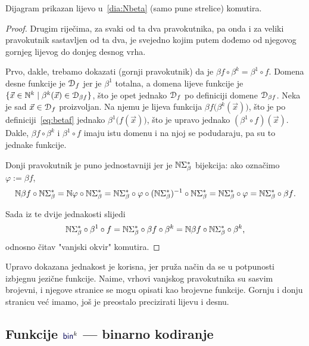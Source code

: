 \begin{lema}\label{lm:pravkomut}
Dijagram prikazan lijevo u~\eqref{dia:Nbeta} (samo pune strelice) komutira.
\end{lema}
\begin{proof}
Drugim riječima, za svaki od ta dva pravokutnika, pa onda i za veliki pravokutnik sastavljen od ta dva, je svejedno kojim putem dođemo od njegovog gornjeg lijevog do donjeg desnog vrha.

Prvo, dakle, trebamo dokazati (gornji pravokutnik) da je $\beta f\circ\beta^k =\beta^1\circ f$. Domena desne funkcije je $\mathcal D_{f}$ jer je $\beta^1$ totalna, a domena lijeve funkcije je $\{\vec x\in{\mathbb N}^k\mid\beta^k(\vec x)\in\mathcal D_{\beta f}\}$, što je opet jednako $\mathcal D_{f}$ po definiciji domene $\mathcal D_{\beta f}$. Neka je sad $\vec x\in\mathcal D_{f}$ proizvoljan. Na njemu je lijeva funkcija $\beta f\bigl(\beta^k(\vec x)\bigr)$, što je po definiciji~\eqref{eq:betaf} jednako $\beta^1\bigl(f(\vec x)\bigr)$, što je upravo jednako $(\beta^1\circ f)(\vec x)$. Dakle, $\beta f\circ\beta^k$ i $\beta^1\circ f$ imaju istu domenu i na njoj se podudaraju, pa su to jednake funkcije.

Donji pravokutnik je puno jednostavniji jer je ${\mathbb N}\Sigma_\beta^*$ bijekcija: ako označimo $\varphi:=\beta f$,
\begin{equation}
    {\mathbb N}\beta f\circ{\mathbb N}\Sigma_\beta^*={\mathbb N}\varphi\circ{\mathbb N}\Sigma_\beta^*={\mathbb N}\Sigma_\beta^*\circ\varphi\circ({\mathbb N}\Sigma_\beta^*)^{-1}\circ{\mathbb N}\Sigma_\beta^*={\mathbb N}\Sigma_\beta^*\circ\varphi={\mathbb N}\Sigma_\beta^*\circ\beta f\text.
\end{equation}

Sada iz te dvije jednakosti slijedi
\begin{equation}\label{eq:pravkomut}
    {\mathbb N}\Sigma_\beta^*\circ\beta^1\circ f={\mathbb N}\Sigma_\beta^*\circ\beta f\circ\beta^k={\mathbb N}\beta f\circ{\mathbb N}\Sigma_\beta^*\circ\beta^k\text,
\end{equation}
odnosno čitav "\!vanjski okvir" komutira.
\end{proof}

Upravo dokazana jednakost je korisna, jer pruža način da se u potpunosti izbjegnu jezične funkcije. Naime, vrhovi vanjskog pravokutnika su sasvim brojevni, i njegove stranice se mogu opisati kao brojevne funkcije. Gornju i donju stranicu već imamo, još je preostalo precizirati lijevu i desnu.

\subsection{Funkcije \texorpdfstring{$\f{bin}^k$}{bin} --- binarno kodiranje}

